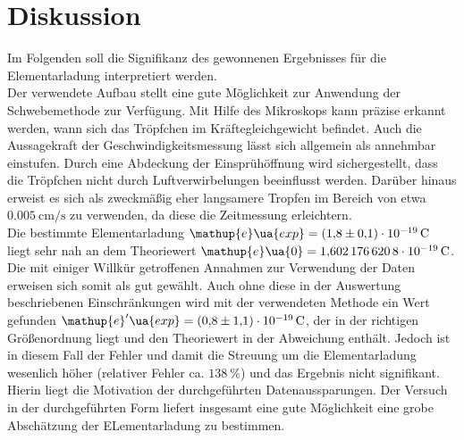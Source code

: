 \newpage \section{Diskussion}
Im Folgenden soll die Signifikanz des gewonnenen Ergebnisses für die Elementarladung interpretiert werden. \\
Der verwendete Aufbau stellt eine gute Möglichkeit zur Anwendung der Schwebemethode zur Verfügung. Mit Hilfe des Mikroskops
kann präzise erkannt werden, wann sich das Tröpfchen im Kräftegleichgewicht befindet. Auch die Aussagekraft der Geschwindigkeitsmessung lässt
sich allgemein als annehmbar einstufen. Durch eine Abdeckung der Einsprühöffnung wird sichergestellt, dass die
Tröpfchen nicht durch Luftverwirbelungen beeinflusst werden. Darüber hinaus erweist es sich als zweckmäßig eher langsamere Tropfen
im Bereich von etwa $\SI{0.005}{\centi\meter \per \second}$ zu verwenden, da diese die Zeitmessung erleichtern. \\
Die bestimmte Elementarladung $\mathup{e}\ua{exp} = \SI{+1.8(1)e-19}{\coulomb}$ liegt sehr nah an dem Theoriewert
$\mathup{e}\ua{0} = \SI{1.6021766208e-19}{\coulomb}$. Die mit einiger Willkür getroffenen Annahmen zur Verwendung der Daten erweisen sich
somit als gut gewählt. Auch ohne diese in der Auswertung beschriebenen Einschränkungen wird mit der verwendeten Methode ein Wert gefunden
$\mathup{e}'\ua{exp} = \SI{+0.8(11)e-19}{\coulomb}$, der in der richtigen Größenordnung liegt und den Theoriewert in der Abweichung enthält. Jedoch ist in
diesem Fall der Fehler und damit die Streuung um die Elementarladung wesenlich höher (relativer Fehler ca. $\SI{138}{\percent}$) und das Ergebnis %
nicht signifikant. Hierin liegt die Motivation der durchgeführten Datenaussparungen. %
Der Versuch in der durchgeführten Form liefert insgesamt eine gute Möglichkeit eine grobe Abschätzung der ELementarladung zu bestimmen.

